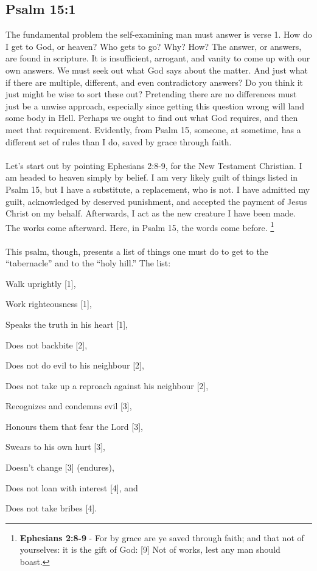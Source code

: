 \subsection{Psalm 15:1}
The fundamental problem the self-examining man must answer is verse 1. How do I get to God, or heaven? Who gets to go? Why? How? The answer, or answers, are found in scripture.  It is insufficient, arrogant, and vanity to come up with our own answers. We must seek out what God says about the matter. And just what if there are multiple, different, and even contradictory answers? Do you think it just might be wise to sort these out? Pretending there are no differences must just be a unwise approach, especially since getting this question wrong will land some body in Hell. Perhaps we ought to find out what God requires, and then meet that requirement. Evidently, from Psalm 15, someone, at sometime, has a different set of rules than I do, saved by grace through faith.\\
\\
Let's start out by pointing Ephesians 2:8-9, for the New Testament Christian. I am headed to heaven simply by belief. I am very likely guilt of things listed in Psalm 15, but I have a substitute, a replacement, who is not. I have admitted my guilt, acknowledged by deserved punishment, and accepted the payment of Jesus Christ on my behalf. Afterwards, I act as the new creature I have been made. The works come afterward. Here, in Psalm 15, the words come before. \footnote{\textbf{Ephesians 2:8-9} - For by grace are ye saved through faith; and that not of yourselves: it is the gift of God: [9] Not of works, lest any man should boast.}\\
\\
This psalm, though, presents a list of things one must do to get to the ``tabernacle'' and to the ``holy hill.'' The list:
\begin{compactenum}
    \item Walk uprightly [1],
    \item Work righteousness [1],
    \item Speaks the truth in his heart [1],
    \item Does not backbite [2],
    \item Does not do evil to his neighbour [2],
    \item Does not take up a reproach against his neighbour [2],
    \item Recognizes and condemns evil [3],
    \item Honours them that fear the Lord [3],
    \item Swears to his own hurt [3],
    \item Doesn't change [3] (endures),
    \item Does not loan with interest [4], and
    \item Does not take bribes [4].\\
\end{compactenum}
